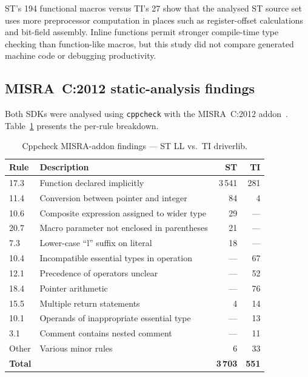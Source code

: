 ST's 194 functional macros versus TI's 27 show that the analysed ST source set uses more
preprocessor computation in places such as register-offset calculations and bit-field
assembly. Inline functions permit stronger compile-time type checking than function-like
macros, but this study did not compare generated machine code or debugging productivity.

\subsection{MISRA~C:2012 static-analysis findings}
\label{subsec:ti-misra}

Both SDKs were analysed using \texttt{cppcheck} with the MISRA~C:2012
addon~\cite{misra-c2012}. Table~\ref{tab:ti-misra} presents the per-rule breakdown.

\begin{table}[H]
\centering
\caption{Cppcheck MISRA-addon findings --- ST LL vs.\ TI driverlib.}
\label{tab:ti-misra}
\begin{tabular}{l l r r}
\toprule
\textbf{Rule} & \textbf{Description} & \textbf{ST} & \textbf{TI} \\
\midrule
17.3 & Function declared implicitly       & 3\,541 &  281 \\
11.4 & Conversion between pointer and integer & 84 &    4 \\
10.6 & Composite expression assigned to wider type & 29 & --- \\
20.7 & Macro parameter not enclosed in parentheses & 21 & --- \\
7.3  & Lower-case ``l'' suffix on literal  &    18 & --- \\
10.4 & Incompatible essential types in operation & --- & 67 \\
12.1 & Precedence of operators unclear     & --- &   52 \\
18.4 & Pointer arithmetic                  & --- &   76 \\
15.5 & Multiple return statements          &     4 &   14 \\
10.1 & Operands of inappropriate essential type & --- & 13 \\
3.1  & Comment contains nested comment     & --- &   11 \\
Other & Various minor rules                &    6 &   33 \\
\midrule
\textbf{Total} & & \textbf{3\,703} & \textbf{551} \\
\bottomrule
\end{tabular}
\end{table}

